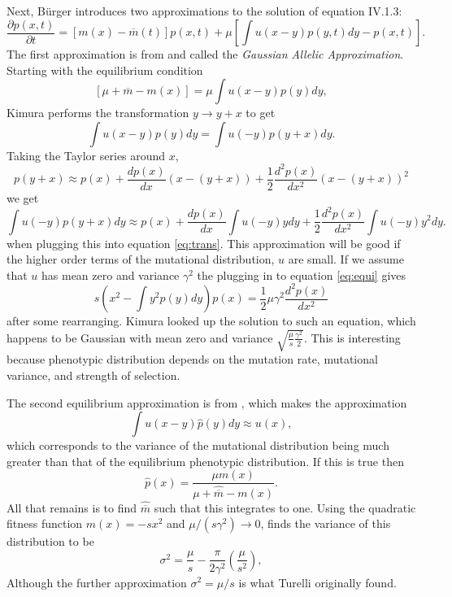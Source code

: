 Next, B{\"u}rger introduces two approximations to the solution of equation IV.1.3:
\begin{equation} \label{eq:1.3}
\frac{\partial p(x,t)}{\partial t} = \left[ m(x) - \overline{m}(t) \right]p(x,t) + \mu \left[ \int u(x-y)p(y,t)dy -p(x,t)\right].
\end{equation}
The first approximation is from \citet{Kimura1965} and called the \emph{Gaussian Allelic Approximation}. Starting with
the equilibrium condition
\begin{equation} \label{eq:equi}
\left[ \mu + \overline{m} - m(x) \right] = \mu \int u(x-y) p(y)dy, 
\end{equation}
Kimura performs the transformation $y \to y + x$ to get
\begin{equation} \label{eq:trans}
\int u(x-y) p(y) dy = \int u(-y)p(y+x)dy.
\end{equation}
Taking the Taylor series around $x$, 
\begin{equation}
p(y+x) \approx p(x) + \frac{dp(x)}{dx}\left( x-(y+x) \right) + \frac{1}{2} \frac{d^2p(x)}{dx^2}\left( x-(y+x) \right)^2
\end{equation}
we get
\begin{equation}
\int u(-y)p(y+x)dy \approx p(x) + \frac{dp(x)}{dx} \int u(-y)y dy + \frac{1}{2} \frac{d^2p(x)}{dx^2}\int u(-y)y^2dy.
\end{equation}
when plugging this into equation \ref{eq:trans}. This approximation will be good if the higher order terms of the
mutational distribution, $u$ are small. If we assume that $u$ has mean zero and variance $\gamma^2$ the plugging in to 
equation \ref{eq:equi} gives
\begin{equation}
s\left( x^2 - \int y^2p(y)dy\right)p(x) = \frac{1}{2}\mu\gamma^2\frac{d^2p(x)}{dx^2}
\end{equation}
after some rearranging. Kimura looked up the solution to such an equation, which happens to be Gaussian with mean zero
and variance $\sqrt{\frac{\mu}{s}\frac{\gamma^2}{2}}$. This is interesting because phenotypic distribution depends on
the mutation rate, mutational variance, and strength of selection.

The second equilibrium approximation is from \citet{Turelli1984}, which makes the approximation 
\begin{equation}
\int u(x-y)\hat{p}(y)dy \approx u(x), 
\end{equation}
which corresponds to the variance of the mutational distribution being much greater than that of the equilibrium
phenotypic distribution. If this is true then 
\begin{equation}
\hat{p}(x) = \frac{\mu m(x)}{\mu + \hat{\overline{m}} - m(x)}.
\end{equation}
All that remains is to find $\hat{\overline{m}}$ such that this integrates to one. Using the quadratic fitness function
$m(x)=-sx^2$ and $\mu/(s\gamma^2) \to 0$, \citet{burger2000mathematical} finds the variance of this distribution to be
\begin{equation}
\sigma^2 = \frac{\mu}{s} - \frac{\pi}{2\gamma^2}\left( \frac{\mu}{s^2}\right), 
\end{equation}
Although the further approximation $\sigma^2=\mu/s$ is what Turelli originally found.

